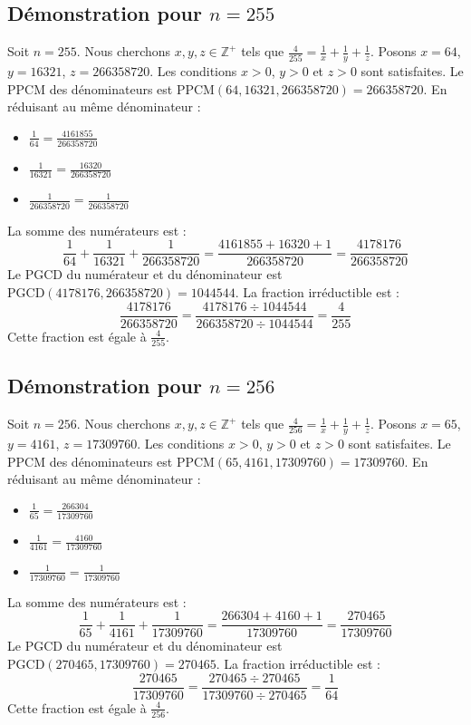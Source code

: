 \documentclass[11pt,a4paper]{article}
\begin{document}
\subsection{Démonstration pour $n = 255$}
Soit $n = 255$. Nous cherchons $x, y, z \in \mathbb{Z}^{+}$ tels que $\frac{4}{255} = \frac{1}{x} + \frac{1}{y} + \frac{1}{z}$.
Posons $x = 64$, $y = 16321$, $z = 266358720$.
Les conditions $x > 0$, $y > 0$ et $z > 0$ sont satisfaites.
Le PPCM des dénominateurs est $\text{PPCM}(64, 16321, 266358720) = 266358720$.
En réduisant au même dénominateur :
\begin{itemize}
    \item $\frac{1}{64} = \frac{4161855}{266358720}$
    \item $\frac{1}{16321} = \frac{16320}{266358720}$
    \item $\frac{1}{266358720} = \frac{1}{266358720}$
\end{itemize}
La somme des numérateurs est :
$$ \frac{1}{64} + \frac{1}{16321} + \frac{1}{266358720} = \frac{4161855 + 16320 + 1}{266358720} = \frac{4178176}{266358720} $$
Le PGCD du numérateur et du dénominateur est $\text{PGCD}(4178176, 266358720) = 1044544$.
La fraction irréductible est :
$$ \frac{4178176}{266358720} = \frac{4178176 \div 1044544}{266358720 \div 1044544} = \frac{4}{255} $$
Cette fraction est égale à $\frac{4}{255}$.

\subsection{Démonstration pour $n = 256$}
Soit $n = 256$. Nous cherchons $x, y, z \in \mathbb{Z}^{+}$ tels que $\frac{4}{256} = \frac{1}{x} + \frac{1}{y} + \frac{1}{z}$.
Posons $x = 65$, $y = 4161$, $z = 17309760$.
Les conditions $x > 0$, $y > 0$ et $z > 0$ sont satisfaites.
Le PPCM des dénominateurs est $\text{PPCM}(65, 4161, 17309760) = 17309760$.
En réduisant au même dénominateur :
\begin{itemize}
    \item $\frac{1}{65} = \frac{266304}{17309760}$
    \item $\frac{1}{4161} = \frac{4160}{17309760}$
    \item $\frac{1}{17309760} = \frac{1}{17309760}$
\end{itemize}
La somme des numérateurs est :
$$ \frac{1}{65} + \frac{1}{4161} + \frac{1}{17309760} = \frac{266304 + 4160 + 1}{17309760} = \frac{270465}{17309760} $$
Le PGCD du numérateur et du dénominateur est $\text{PGCD}(270465, 17309760) = 270465$.
La fraction irréductible est :
$$ \frac{270465}{17309760} = \frac{270465 \div 270465}{17309760 \div 270465} = \frac{1}{64} $$
Cette fraction est égale à $\frac{4}{256}$.
\end{document}
